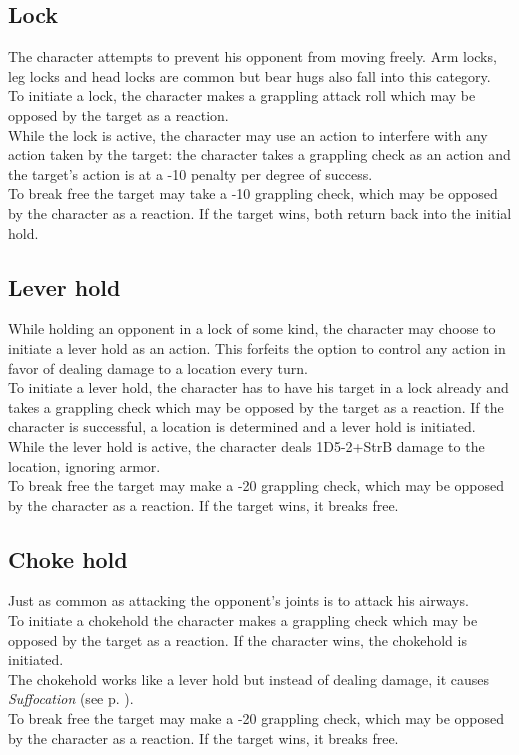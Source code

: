 \subsection*{Lock}
The character attempts to prevent his opponent from moving freely. Arm locks, leg locks and head locks are common but bear hugs also fall into this category.\\
To initiate a lock, the character makes a grappling attack roll which may be opposed by the target as a reaction.\\
While the lock is active, the character may use an action to interfere with any action taken by the target: the character takes a grappling check as an action and the target’s action is at a -10 penalty per degree of success.\\
To break free the target may take a -10 grappling check, which may be opposed by the character as a reaction. If the target wins, both return back into the initial hold.
\subsection*{Lever hold}
While holding an opponent in a lock of some kind, the character may choose to initiate a lever hold as an action. This forfeits the option to control any action in favor of dealing damage to a location every turn.\\
To initiate a lever hold, the character has to have his target in a lock already and takes a grappling check which may be opposed by the target as a reaction. If the character is successful, a location is determined and a lever hold is initiated.\\
While the lever hold is active, the character deals 1D5-2+StrB damage to the location, ignoring armor.\\
To break free the target may make a -20 grappling check, which may be opposed by the character as a reaction. If the target wins, it breaks free.
\subsection*{Choke hold}
Just as common as attacking the opponent's joints is to attack his airways.\\
To initiate a chokehold the character makes a grappling check which may be opposed by the target as a reaction. If the character wins, the chokehold is initiated.\\
The chokehold works like a lever hold but instead of dealing damage, it causes \emph{Suffocation} (see p. \pageref{hazards:suffocation}).\\
To break free the target may make a -20 grappling check, which may be opposed by the character as a reaction. If the target wins, it breaks free.
